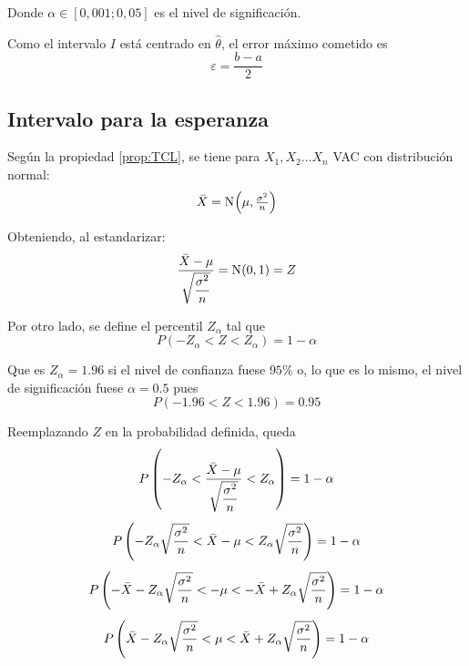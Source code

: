 Donde $\alpha \in [0,001 ; 0,05]$ es el nivel de significación.

Como el intervalo $I$ está centrado en $\hat{\theta}$, el error máximo cometido es
\begin{equation*}
    \varepsilon = \frac{b-a}{2}
\end{equation*}


\subsection{Intervalo para la esperanza}

Según la propiedad \ref{prop:TCL}, se tiene para $X_1, X_2 \dots X_n$ VAC con distribución normal:
\begin{equation*}
    \ave{X} = \fx[\nor]{\mu, \tfrac{\sigma^2}{n}}
\end{equation*}

Obteniendo, al estandarizar:
\begin{equation*}
    \frac{\ave{X}-\mu}{\sqrt{\dfrac{\sigma^2}{n}}} = \fx[\nor]{0,1} = Z
\end{equation*}

Por otro lado, se define el percentil $Z_\alpha$ tal que
\begin{equation*}
    P(-Z_\alpha<Z<Z_\alpha) = 1 - \alpha
\end{equation*}

Que es $Z_\alpha=1.96$ si el nivel de confianza fuese $95\%$ o, lo que es lo mismo, el nivel de significación fuese $\alpha=0.5$ pues
\begin{equation*}
    P(-1.96<Z<1.96) = 0.95
\end{equation*}

Reemplazando $Z$ en la probabilidad definida, queda
\begin{gather*}
    P \inParentheses{ -Z_\alpha < \frac{\ave{X}-\mu}{\sqrt{\dfrac{\sigma^2}{n}}} < Z_\alpha } = 1 - \alpha
    \\[1ex]
    P \inParentheses{ - Z_\alpha \sqrt{\frac{\sigma^2}{n}} < \ave{X} - \mu < Z_\alpha \sqrt{\frac{\sigma^2}{n}} } = 1 - \alpha
    \\[1ex]
    P \inParentheses{ - \ave{X} - Z_\alpha \sqrt{\frac{\sigma^2}{n}} < -\mu < - \ave{X} + Z_\alpha \sqrt{\frac{\sigma^2}{n}} } = 1 - \alpha
    \\[1ex]
    P \inParentheses{ \ave{X} - Z_\alpha \sqrt{\frac{\sigma^2}{n}} < \mu < \ave{X} + Z_\alpha \sqrt{\frac{\sigma^2}{n}} } = 1 - \alpha
\end{gather*}

